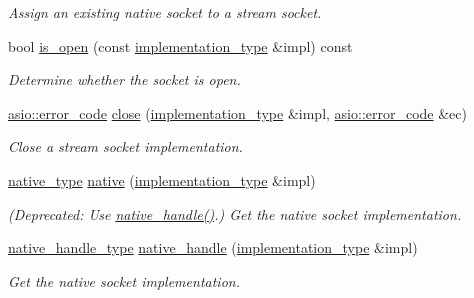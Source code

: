 \begin{DoxyCompactItemize}
\begin{DoxyCompactList}\small\item\em Assign an existing native socket to a stream socket. \end{DoxyCompactList}\item 
bool \hyperlink{classasio_1_1stream__socket__service_af78dc1f9ba53bf978dd5946ce8bc8089}{is\+\_\+open} (const \hyperlink{classasio_1_1stream__socket__service_a3e2c55b4aaf6bab6dfa83c8dbf5b236a}{implementation\+\_\+type} \&impl) const 
\begin{DoxyCompactList}\small\item\em Determine whether the socket is open. \end{DoxyCompactList}\item 
\hyperlink{classasio_1_1error__code}{asio\+::error\+\_\+code} \hyperlink{classasio_1_1stream__socket__service_a0f179f0e1530dd68abd61a0b7b334dfc}{close} (\hyperlink{classasio_1_1stream__socket__service_a3e2c55b4aaf6bab6dfa83c8dbf5b236a}{implementation\+\_\+type} \&impl, \hyperlink{classasio_1_1error__code}{asio\+::error\+\_\+code} \&ec)
\begin{DoxyCompactList}\small\item\em Close a stream socket implementation. \end{DoxyCompactList}\item 
\hyperlink{classasio_1_1stream__socket__service_a26842938d909788add79ee91c2e6146c}{native\+\_\+type} \hyperlink{classasio_1_1stream__socket__service_a94070f3a37f06e1d2e502e15e1151c2f}{native} (\hyperlink{classasio_1_1stream__socket__service_a3e2c55b4aaf6bab6dfa83c8dbf5b236a}{implementation\+\_\+type} \&impl)
\begin{DoxyCompactList}\small\item\em (Deprecated\+: Use \hyperlink{classasio_1_1stream__socket__service_ab13bc233a6364a769188b64f770b9785}{native\+\_\+handle()}.) Get the native socket implementation. \end{DoxyCompactList}\item 
\hyperlink{classasio_1_1stream__socket__service_a357418641fad207a19bade585d086876}{native\+\_\+handle\+\_\+type} \hyperlink{classasio_1_1stream__socket__service_ab13bc233a6364a769188b64f770b9785}{native\+\_\+handle} (\hyperlink{classasio_1_1stream__socket__service_a3e2c55b4aaf6bab6dfa83c8dbf5b236a}{implementation\+\_\+type} \&impl)
\begin{DoxyCompactList}\small\item\em Get the native socket implementation. \end{DoxyCompactList}\item 

\end{DoxyCompactItemize}
